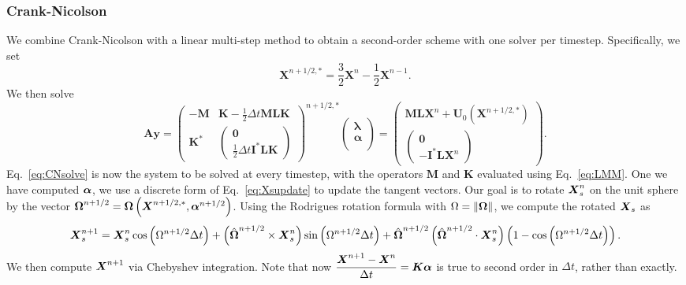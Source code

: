\subsubsection{Crank-Nicolson}
We combine Crank-Nicolson with a linear multi-step method to obtain a second-order scheme with one solver per timestep. Specifically, we set
\begin{equation}
\label{eq:LMM}
\bm{X}^{n+1/2, *} = \frac{3}{2}\bm{X}^n - \frac{1}{2}\bm{X}^{n-1}.
\end{equation}
We then solve 
\begin{equation}
\label{eq:CNsolve}
\bm{A}\bm{y}=
    \begin{pmatrix}
    -\bm{M} &\bm{K}-\frac{1}{2}\Delta t \bm{MLK}\\[4 pt]
   \bm{K}^* &\begin{pmatrix} \bm{0}\\[2 pt]\frac{1}{2}\Delta t \bm{I}^*\bm{LK}\end{pmatrix} 
    \end{pmatrix}^{n+1/2, *}
    \begin{pmatrix} 
    \bm{\lambda}\\[4 pt]
    \bm{\alpha}\\[4 pt]
    \end{pmatrix} =  \begin{pmatrix} 
   \bm{ML}\bm{X}^n+\bm{U}_0(\bm{X}^{n+1/2, *})\\[4 pt]
    \begin{pmatrix} \bm{0}\\[4 pt]
    -\bm{I}^*\bm{L}\bm{X}^n \end{pmatrix}
    \end{pmatrix}.
\end{equation}
Eq.\ \eqref{eq:CNsolve} is now the system to be solved at every timestep, with the operators $\bm{M}$ and $\bm{K}$ evaluated using Eq.\ \eqref{eq:LMM}. One we have computed $\boldsymbol{\alpha}$, we use a discrete form of Eq.\ \eqref{eq:Xsupdate} to update the tangent vectors. Our goal is to rotate $\boldsymbol{X}_s^n$ on the unit sphere by the vector $\boldsymbol{\Omega}^{n+1/2} =  \boldsymbol{\Omega}\left(\boldsymbol{X}^{n+1/2,*},\boldsymbol{\alpha}^{n+1/2}\right)$. Using the Rodrigues rotation formula with $\Omega = \left\Vert \boldsymbol{\Omega}\right\Vert$, we compute the rotated $\boldsymbol{X}_s$ as
\begin{equation}
\boldsymbol{X}_s^{n+1} = \boldsymbol{X}_s^n \cos{\left(\Omega^{n+1/2}\Delta t\right)} + \left(\hat{\boldsymbol{\Omega}}^{n+1/2} \times \boldsymbol{X}_s^n \right)  \sin{\left(\Omega^{n+1/2}\Delta t\right)}+\hat{\boldsymbol{\Omega}}^{n+1/2}\left(\hat{\boldsymbol{\Omega}}^{n+1/2} \cdot \boldsymbol{X}_s^n\right)\left(1-\cos{\left(\Omega^{n+1/2}\Delta t\right)}\right).
\end{equation}
We then compute $\boldsymbol{X}^{n+1}$ via Chebyshev integration. Note that now $\displaystyle{\frac{\boldsymbol{X}^{n+1}-\boldsymbol{X}^n}{\Delta t} = \boldsymbol{K}\boldsymbol{\alpha}}$ is true to second order in $\Delta t$, rather than exactly. 

